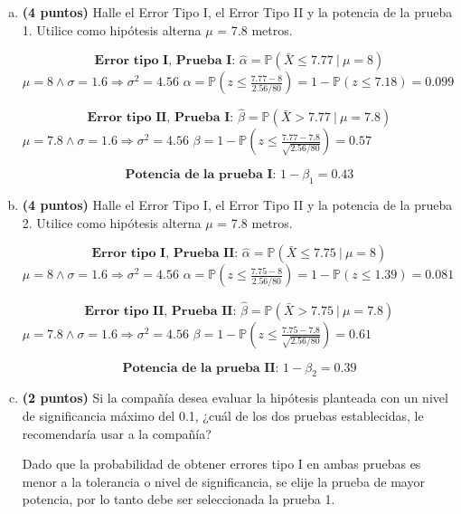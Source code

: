 \documentclass[../main.tex]{subfiles}
\begin{document}
\begin{enumerate}[(a)]

\item \textbf{(4 puntos)} Halle el Error Tipo I, el Error Tipo II y la potencia de la prueba 1. Utilice como hipótesis alterna $\mu$ = 7.8 metros.

$$\textbf{Error tipo I, Prueba I: } \hat{\alpha} =  \mathbb{P}(\bar{X} \leq 7.77\ |\ \mu = 8)$$
$\mu = 8 \wedge \sigma = 1.6 \Rightarrow \sigma ^ 2 = 4.56$
$\alpha = \mathbb{P}(z \leq \frac{7.77 - 8}{2.56 / 80}) = 1 - \mathbb{P}(z \leq 7.18) = 0.099$

$$\textbf{Error tipo II, Prueba I: } \hat{\beta} =  \mathbb{P}(\bar{X} > 7.77\ |\ \mu = 7.8)$$
$\mu = 7.8 \wedge \sigma = 1.6 \Rightarrow \sigma ^ 2 = 4.56$
$\beta =1 -  \mathbb{P}(z \leq \frac{7.77 - 7.8}{\sqrt{2.56 / 80}}) = 0.57$

$$\textbf{Potencia de la prueba I:\ } 1 - \beta_1 = 0.43$$

\item \textbf{(4 puntos)} Halle el Error Tipo I, el Error Tipo II y la potencia de la prueba 2. Utilice como hipótesis alterna $\mu$ = 7.8 metros.

$$\textbf{Error tipo I, Prueba II: } \hat{\alpha} =  \mathbb{P}(\bar{X} \leq 7.75\ |\ \mu = 8)$$
$\mu = 8 \wedge \sigma = 1.6 \Rightarrow \sigma ^ 2 = 4.56$
$\alpha = \mathbb{P}(z \leq \frac{7.75 - 8}{2.56 / 80}) = 1 - \mathbb{P}(z \leq 1.39) = 0.081$

$$\textbf{Error tipo II, Prueba II: } \hat{\beta} =  \mathbb{P}(\bar{X} > 7.75\ |\ \mu = 7.8)$$
$\mu = 7.8 \wedge \sigma = 1.6 \Rightarrow \sigma ^ 2 = 4.56$
$\beta =1 -  \mathbb{P}(z \leq \frac{7.75 - 7.8}{\sqrt{2.56 / 80}}) = 0.61$

$$\textbf{Potencia de la prueba II:\ } 1 - \beta_2 = 0.39$$

\item \textbf{(2 puntos)} Si la compañía desea evaluar la hipótesis planteada con un nivel de significancia máximo del 0.1, ¿cuál de los dos pruebas establecidas, le recomendaría usar a la compañía?

Dado que la probabilidad de obtener errores tipo I en ambas pruebas es menor a la tolerancia o nivel de significancia, se elije la prueba de mayor potencia, por lo tanto debe ser seleccionada la prueba 1.

\end{enumerate}
\end{document}
